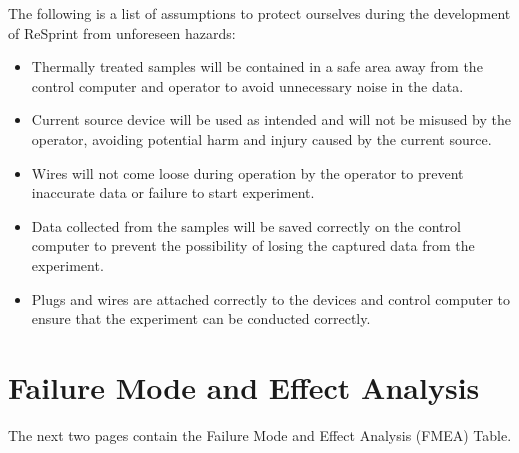 \documentclass{article}
\begin{document}
\noindent The following is a list of assumptions to protect ourselves during the development of ReSprint from unforeseen hazards:

\begin{itemize}
  \item Thermally treated samples will be contained in a safe area away from the control computer and operator to avoid unnecessary noise in the data. 
  \item Current source device will be used as intended and will not be misused by the operator, avoiding potential harm and injury caused by the current source.
  \item Wires will not come loose during operation by the operator to prevent inaccurate data or failure to start experiment.
  \item Data collected from the samples will be saved correctly on the control computer to prevent the possibility of losing the captured data from the experiment.
  \item Plugs and wires are attached correctly to the devices and control computer to ensure that the experiment can be conducted correctly.
\end{itemize}


\section{Failure Mode and Effect Analysis}
The next two pages contain the Failure Mode and Effect Analysis (FMEA) Table.
\end{document}
